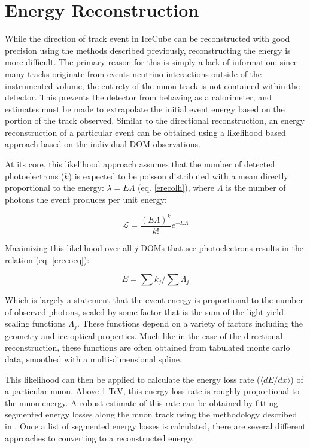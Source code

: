 \section{Energy Reconstruction}
While the direction of track event in IceCube can be reconstructed with good precision using the methods described previously, reconstructing the energy is more difficult. The primary reason for this is simply a lack of information: since many tracks originate from events neutrino interactions outside of the instrumented volume, the entirety of the muon track is not contained within the detector. This prevents the detector from behaving as a calorimeter, and estimates must be made to extrapolate the initial event energy based on the portion of the track observed. Similar to the directional reconstruction, an energy reconstruction of a particular event can be obtained using a likelihood based approach based on the individual DOM observations. 

At its core, this likelihood approach assumes that the number of detected photoelectrons ($k$) is expected to be poisson distributed with a mean directly proportional to the energy: $\lambda=E \Lambda$ (eq. \ref{erecolh}), where $\Lambda$ is the number of photons the event produces per unit energy:

\begin{equation}
    \mathcal{L} = \frac{(E \Lambda)^k}{k!} e ^ {-E \Lambda}
\label{erecolh}
\end{equation}

Maximizing this likelihood over all $j$ DOMs that see photoelectrons results in the relation (eq. \ref{erecoeq}):

\begin{equation}
    E = \sum{k_j}/\sum{\Lambda_j}
\label{erecoeq}
\end{equation}

Which is largely a statement that the event energy is proportional to the number of observed photons, scaled by some factor that is the sum of the light yield scaling functions $\Lambda_j$. These functions depend on a variety of factors including the geometry and ice optical properties. Much like in the case of the directional reconstruction, these functions are often obtained from tabulated monte carlo data, smoothed with a multi-dimensional spline. 

This likelihood can then be applied to calculate the energy loss rate ($\langle dE/dx \rangle$) of a particular muon. Above 1 TeV, this energy loss rate is roughly proportional to the muon energy. A robust estimate of this rate can be obtained by fitting segmented energy losses along the muon track using the methodology described in \cite{erecopaper}. Once a list of segmented energy losses is calculated, there are several different approaches to converting to a reconstructed energy. 

